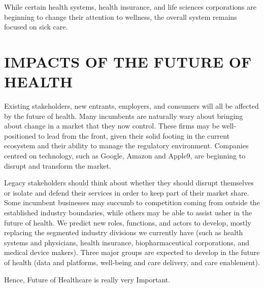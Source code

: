 \documentclass{article}
\begin{document}
    While certain health systems, health insurance, and life sciences corporations are beginning to change their attention to wellness, the overall system remains focused on sick care.

\section{IMPACTS OF THE FUTURE OF HEALTH}

    Existing stakeholders, new entrants, employers, and consumers will all be affected by the future of health. Many incumbents are naturally wary about bringing about change in a market that they now control. These firms may be well-positioned to lead from the front, given their solid footing in the current ecosystem and their ability to manage the regulatory environment. Companies centred on technology, such as Google, Amazon and Apple9, are beginning to disrupt and transform the market.

    Legacy stakeholders should think about whether they should disrupt themselves or isolate and defend their services in order to keep part of their market share. Some incumbent businesses may succumb to competition coming from outside the established industry boundaries, while others may be able to assist usher in the future of health. We predict new roles, functions, and actors to develop, mostly replacing the segmented industry divisions we currently have (such as health systems and physicians, health insurance, biopharmaceutical corporations, and medical device makers). Three major groups are expected to develop in the future of health (data and platforms, well-being and care delivery, and care enablement). 

    Hence, Future of Healthcare is really very Important.
%
%
\end{document}
